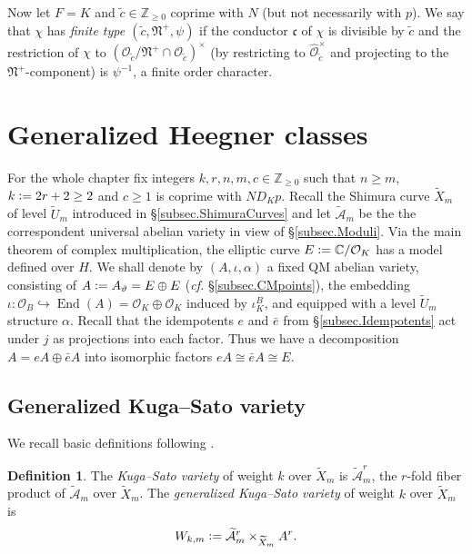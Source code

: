 \documentclass[a4paper]{amsart}
\numberwithin{equation}{section}
\theoremstyle{definition}
\newtheorem{definition}[theorem]{Definition}
\newcommand{\Z}{\mathbb{Z}}
\newcommand{\C}{\mathbb{C}}
\newcommand{\defeq}{\vcentcolon=}
\DeclareMathOperator{\End}{End}
\begin{document}
Now let $F=K$ and $\widetilde{c}\in\Z_{\ge0}$ coprime with $N$ (but not necessarily with $p$). We say that $\chi$ has \textit{finite type $(\widetilde{c},\mathfrak{N}^+,\psi)$} if the conductor $\mathfrak{c}$ of $\chi$ is divisible by $\widetilde{c}$ and the restriction of $\chi$ to $(\mathcal{O}_{\widetilde{c}}/\mathfrak{N}^+\cap\mathcal{O}_{\widetilde{c}})^\times$ (by restricting to $\widehat{\mathcal{O}}_{\widetilde{c}}^\times$ and projecting to the $\mathfrak{N}^+$-component) is $\psi^{-1}$, a finite order character.

\section{Generalized Heegner classes}\label{sec.GeneralizedHeegnerClasses}
For the whole chapter fix integers $k,r,n,m,c\in\Z_{\ge0}$ such that $n\ge m$, $k\defeq 2r+2\ge 2$ and $c\geq 1$ is coprime with $ND_Kp$. Recall the Shimura curve $\widetilde{X}_m$ of level $\widetilde{U}_m$ introduced in \S\ref{subsec.ShimuraCurves} and let $\widetilde{\mathcal{A}}_m$ be the the correspondent universal abelian variety in view of \S\ref{subsec.Moduli}. Via the main theorem of complex multiplication, the elliptic curve $E\defeq \C/\mathcal{O}_K$ has a model defined over $H$. We shall denote by $(A,\iota,\alpha)$ a fixed QM abelian variety, consisting of $A\defeq A_{\vartheta}= E\oplus E$ (\textit{cf.} \S\ref{subsec.CMpoints}), the embedding $\iota\colon\mathcal{O}_B\hookrightarrow\End(A)=\mathcal{O}_K\oplus\mathcal{O}_K$ induced by $\iota_K^B$, and equipped with a level $\widetilde{U}_m$ structure $\alpha$. Recall that the idempotents $e$ and $\bar{e}$ from \S\ref{subsec.Idempotents} act under $j$ as projections into each factor. Thus we have a decomposition $A=eA\oplus\bar{e}A$ into isomorphic factors $eA\cong\bar{e}A\cong E$.

\subsection{Generalized Kuga--Sato variety}
We recall basic definitions following \cite[\S 2.6]{Brooks}.

\begin{definition}
The \textit{Kuga--Sato variety} of weight $k$ over $\widetilde{X}_m$ is $\widetilde{\mathcal{A}}_m^r$, the $r$-fold fiber product of $\widetilde{\mathcal{A}}_m$ over $\widetilde{X}_m$. The \emph{generalized Kuga--Sato variety} of weight $k$ over $\widetilde{X}_m$ is \[W_{k,m}\defeq\widetilde{\mathcal{A}}_m^{r}\times_{\widetilde{X}_m} A^{r}.\]
\end{definition}
\end{document}
